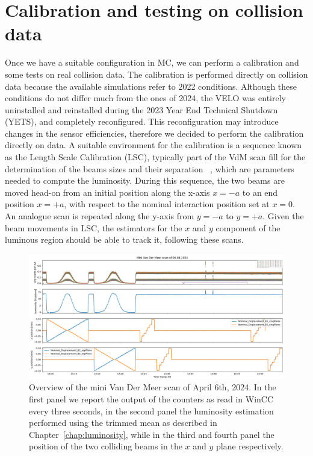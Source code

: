 \section{Calibration and testing on collision data}\label{sec:beamline_calib}
Once we have a suitable configuration in MC, we can perform a calibration and some tests on real collision data. The calibration is performed directly on collision data because the available simulations refer to 2022 conditions. Although these conditions do not differ much from the ones of 2024, the VELO was entirely uninstalled and reinstalled during the 2023 Year End Technical Shutdown (YETS), and completely reconfigured. This reconfiguration may introduce changes in the sensor efficiencies, therefore we decided to perform the calibration directly on data. A suitable environment for the calibration is a sequence known as the Length Scale Calibration (LSC), typically part of the VdM scan fill for the determination of the beams sizes and their separation ~\cite{Balagura_2021}, which are parameters needed to compute the luminosity. During this sequence, the two beams are moved head-on from an initial position along the x-axis $x=-a$ to an end position $x=+a$, with respect to the nominal interaction position set at $x=0$. An analogue scan is repeated along the y-axis from $y=-a$ to $y=+a$. 
Given the beam movements in LSC, the estimators for the $x$ and $y$ component of the luminous region should be able to track it, following these scans.

\begin{figure}
    \centering
    \includegraphics[width=\textwidth]{figures/lumi_with_counters.png}
    \caption{Overview of the mini Van Der Meer scan of April 6th, 2024. In the first panel we report the output of the counters as read in WinCC every three seconds, in the second panel the luminosity estimation performed using the trimmed mean as described in Chapter~\ref{chap:luminosity}, while in the third and fourth panel the position of the two colliding beams in the $x$ and $y$ plane respectively.}
    \label{fig:mini-vdm}
\end{figure}

